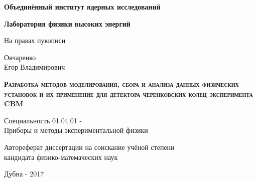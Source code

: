 \begin{titlepage}

\centering

\textbf{
Объединённый институт ядерных исследований
}


\textbf{
Лаборатория физики высоких энергий
}

\vspace{1cm}

\begin{flushright}
На правах пукописи
\end{flushright}

\vspace{1cm}

Овчаренко \\
Егор Владимирович

\vspace{2cm}

\textbf{
\textsc{
Разработка методов моделирования, сбора и анализа данных
физических установок и их применение для детектора черенковских
колец эксперимента CBM
}
}

\vspace{1cm}

Специальность 01.04.01 - \\
Приборы и методы экспериментальной физики

\vspace{2cm}

Автореферат диссертации на соискание учёной степени \\
кандидата физико-матемаческих наук

\vspace{2cm}

Дубна - 2017

\end{titlepage}
